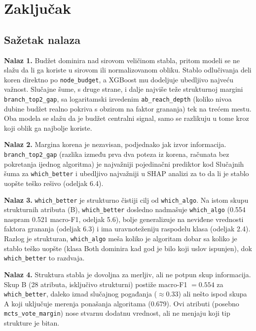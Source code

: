 \documentclass[12pt, a4paper]{article}
\begin{document}
\section{Zaključak}

\subsection{Sažetak nalaza}

\textbf{Nalaz 1.} Budžet dominira nad sirovom veličinom stabla, pritom modeli se ne slažu da li
ga koriste u sirovom ili normalizovanom obliku. Stablo odlučivanja deli koren
direktno po \texttt{node\_budget}, a XGBoost mu dodeljuje ubedljivo najveću
važnost. Slučajne šume, s druge strane, i dalje najviše teže strukturnoj margini
\texttt{branch\_top2\_gap}, sa logaritamski izvedenim \texttt{ab\_reach\_depth} (koliko nivoa
dubine budžet realno pokriva s obzirom na faktor grananja) tek na trećem mestu. Oba modela se
slažu da je budžet centralni signal, samo se razlikuju u tome kroz koji oblik ga najbolje
koriste.

\textbf{Nalaz 2.} Margina korena je nezavisan, podjednako jak izvor informacija.
\texttt{branch\_top2\_gap} (razlika između prva dva poteza iz korena, računata bez pokretanja
ijednog algoritma) je najvažniji pojedinačni prediktor kod Slučajnih šuma za
\texttt{which\_better} i ubedljivo najvažniji u SHAP analizi za to da li je stablo uopšte
teško rešivo (odeljak 6.4). 

\textbf{Nalaz 3.} \texttt{which\_better} je strukturno čistiji cilj od \texttt{which\_algo}.
Na istom skupu strukturnih atributa (B), \texttt{which\_better} dosledno nadmašuje
\texttt{which\_algo} (0.554 naspram 0.521 macro-F1, odeljak 5.6), bolje generalizuje na
neviđene vrednosti faktora grananja (odeljak 6.3) i ima uravnoteženiju raspodelu klasa
(odeljak 2.4). Razlog je strukturan, \texttt{which\_algo} meša koliko
je algoritam dobar sa koliko je stablo teško uopšte (klasa Both dominira kad god je
bilo koji uslov ispunjen), dok \texttt{which\_better} to razdvaja.

\textbf{Nalaz 4.} Struktura stabla je dovoljna za merljiv, ali ne potpun skup informacija. Skup B (28 atributa, isključivo strukturni) postiže macro-F1
$= 0.554$ za \texttt{which\_better}, daleko iznad slučajnog pogađanja ($\approx 0.33$) ali
nešto ispod skupa A koji uključuje merenja ponašanja algoritama (0.679). Ovi atributi
(posebno \texttt{mcts\_vote\_margin}) nose
stvarnu dodatnu vrednost, ali ne menjaju koji tip strukture je bitan.
\end{document}

